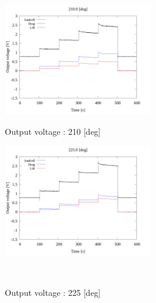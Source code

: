 \begin{figure}[htbp]
      \begin{minipage}[b]{0.45\linewidth}
        \centering
        \includegraphics[width=65mm]{../../02_workspace/result/2-1/plot/01-3_allsensors/01_allsensors_2100.png}
        \caption{Output voltage : 210 [deg]}
      \end{minipage}
      \begin{minipage}[b]{0.45\linewidth}
        \centering
        \includegraphics[width=65mm]{../../02_workspace/result/2-1/plot/01-3_allsensors/01_allsensors_2250.png}
        \caption{Output voltage : 225 [deg]}
      \end{minipage}\\


\end{figure}
